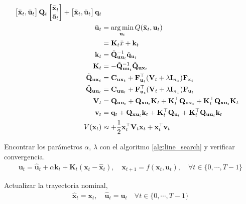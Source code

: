 \begin{algorithm}[H]
{{\begin{align*}
\begin{bmatrix}
            \bar{\mathbf{x}}_t, \bar{\mathbf{u}}_t          
        \end{bmatrix}  \mathbf{Q}_{t}
        \begin{bmatrix}
            \bar{\mathbf x}_t \\
            \bar{\mathbf a}_t
        \end{bmatrix}
        + \begin{bmatrix}
            \bar{\mathbf x}_t, \bar{\mathbf u}_t
        \end{bmatrix}
        \mathbf{q}_t \\
        \bar{\mathbf u}_t &= \operatorname*{arg\,min}_{\mathbf{u}_t}Q(\bar{\mathbf x}_t, \mathbf{u}_t) \\
        &= \mathbf{K}_t \bar{x} + \mathbf{k}_t \\
    \mathbf{k}_{t} &= \tilde{\mathbf{Q}}_{\mathbf{uu}_t}^{-1} \tilde{\mathbf{q}}_{\mathbf{u}_t} \\
    \mathbf{K}_{t} &= -\tilde{\mathbf{Q}}_{\mathbf{uu}_t}^{-1}\tilde{\mathbf{Q}}_{\mathbf{ux}_t} \\
    \tilde{\mathbf{Q}}_{\mathbf{ux}_t} &= 
    \mathbf{C}_{\mathbf{ux}_t} + \mathbf{F}_{\mathbf{u}_t}^{\top}(\mathbf{V}_t + \lambda \mathbf{I}_{n_x})
    \mathbf{F}_{\mathbf{x}_t} \\
    \tilde{\mathbf{Q}}_{\mathbf{uu}_t} &= \mathbf{C}_{\mathbf{uu}_t} + \mathbf{F}_{\mathbf{u}_t}^{\top}(\mathbf{V}_t + \lambda \mathbf{I}_{n_x})
    \mathbf{F}_{\mathbf{u}_t} \\
        \mathbf{V}_t &= \mathbf{Q}_{\mathbf{u}\mathbf{u}_t}  + \mathbf{Q}_{\mathbf x\mathbf{u}_t}\mathbf{K}_t +  \mathbf{K}_t^{\top} \mathbf{Q}_{\mathbf u \mathbf{x}_t} + \mathbf{K}_t^{\top}\mathbf{Q}_{\mathbf{x} \mathbf{u}_t}\mathbf{K}_t \\
        \mathbf{v}_t &= \mathbf{q}_{t} + \mathbf{Q}_{\mathbf x \mathbf{u}_t}\mathbf{k}_t + \mathbf{K}_t^{\top} \mathbf{Q}_{\mathbf{u}_t} + \mathbf{K}_t^{\top} \mathbf{Q}_{\mathbf{u} \mathbf{u}_t} \mathbf{k}_t \\
        V(\mathbf{x}_t) &\approx + \frac{1}{2} \mathbf{x}_t^{\top} \mathbf{V}_t \mathbf{x}_t + \mathbf{x}_t^{\top} \mathbf{v}_t
    \end{align*}
    }

Encontrar los parámetros $\alpha$, $\lambda$ con el algoritmo \ref{alg:line_search} y verificar convergencia.
\begin{align*}
\mathbf{u}_t = \hat{\mathbf{u}}_t + \alpha \mathbf{k}_t + \mathbf{K}_{t}\left(\mathbf{x}_t - \hat{\mathbf{x}}_t\right), \quad
    \mathbf{x}_{t+1} = f(\mathbf{x}_t, \mathbf{u}_t), \quad \forall t \in \{0, \cdots, T-1\}
\end{align*}
}
Actualizar la trayectoria nominal,
\begin{align*}
    \hat{\mathbf{x}}_t = \mathbf{x}_t, \quad \hat{\mathbf{u}}_t = \mathbf{u}_t \quad \forall t \in \{0, \cdots, T-1\}  
\end{align*}
\end{algorithm}
